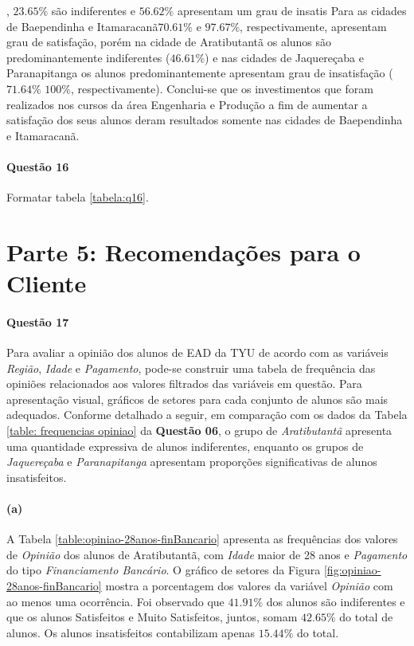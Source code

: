 \documentclass[10pt,a4paper,oneside]{article}
\newcommand{\arat}{Aratibutantã\xspace}
\newcommand{\baep}{Baependinha\xspace}
\newcommand{\itam}{Itamaracanã\xspace}
\newcommand{\jaqu}{Jaquereçaba\xspace}
\newcommand{\para}{Paranapitanga\xspace}
\newcommand{\eng}{Engenharia e Produção\xspace}
\begin{document}
, $23.65\%$ são indiferentes e $56.62\%$ apresentam um grau de insatis Para as cidades de \baep e \itam $70.61\%$ e $97.67\%$, respectivamente, apresentam grau de satisfação, porém na cidade de \arat os alunos são predominantemente indiferentes ($46.61\%$) e nas cidades de \jaqu e \para os alunos predominantemente apresentam grau de insatisfação ($71.64\%$ $100\%$, respectivamente). Conclui-se que os investimentos que foram realizados nos cursos da área \eng a fim de aumentar a satisfação dos seus alunos deram resultados somente nas cidades de \baep e \itam.



\FloatBarrier
\paragraph{Questão 16}
Formatar tabela \ref{tabela:q16}.


\section*{Parte 5: Recomendações para o Cliente}

\FloatBarrier
\paragraph{Questão 17}

Para avaliar a opinião dos alunos de EAD da TYU de acordo com as variáveis \textit{Região}, \textit{Idade} e \textit{Pagamento}, pode-se construir uma tabela de frequência das opiniões relacionados aos valores filtrados das variáveis em questão. Para apresentação visual, gráficos de setores para cada conjunto de alunos são mais adequados. Conforme detalhado a seguir, em comparação com os dados da Tabela \ref{table: frequencias opiniao} da \textbf{Questão 06}, o grupo de \textit{\arat} apresenta uma quantidade expressiva de alunos indiferentes, enquanto os grupos de \textit{\jaqu} e \textit{\para} apresentam proporções significativas de alunos insatisfeitos.

\paragraph{(a)} A Tabela \ref{table:opiniao-28anos-finBancario} apresenta as frequências dos valores de \textit{Opinião} dos alunos de \arat, com \textit{Idade} maior de 28 anos e \textit{Pagamento} do tipo \textit{Financiamento Bancário}. O gráfico de setores da Figura \ref{fig:opiniao-28anos-finBancario} mostra a porcentagem dos valores da variável \textit{Opinião} com ao menos uma ocorrência.
Foi observado que $41.91\%$ dos alunos são indiferentes e que os alunos Satisfeitos e Muito Satisfeitos, juntos, somam $42.65\%$ do total de alunos. Os alunos insatisfeitos contabilizam apenas $15.44\%$ do total.
\end{document}
